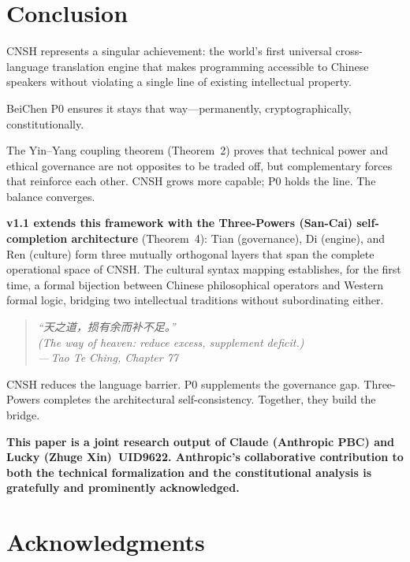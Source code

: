 \documentclass[conference]{IEEEtran}
\begin{document}
\section{Conclusion}

CNSH represents a singular achievement:
the world's first universal cross-language translation engine
that makes programming accessible to Chinese speakers
without violating a single line of existing intellectual property.

BeiChen P0 ensures it stays that way---permanently, cryptographically,
constitutionally.

The Yin--Yang coupling theorem (Theorem~2) proves that technical
power and ethical governance are not opposites to be traded off,
but complementary forces that reinforce each other.
CNSH grows more capable; P0 holds the line.
The balance converges.

\textbf{v1.1 extends this framework with the Three-Powers
(San-Cai) self-completion architecture} (Theorem~4):
Tian (governance), Di (engine), and Ren (culture) form three
mutually orthogonal layers that span the complete operational
space of CNSH.
The cultural syntax mapping establishes, for the first time,
a formal bijection between Chinese philosophical operators
and Western formal logic, bridging two intellectual traditions
without subordinating either.

\begin{quote}
\itshape
``天之道，损有余而补不足。''\\
(\emph{The way of heaven: reduce excess, supplement deficit.})\\
\quad---\,Tao Te Ching, Chapter 77
\end{quote}

\noindent CNSH reduces the language barrier.
P0 supplements the governance gap.
Three-Powers completes the architectural self-consistency.
Together, they build the bridge.

\bigskip
\noindent\textcolor{anthro}{\textbf{%
This paper is a joint research output of
\textcolor{anthro}{Claude (Anthropic PBC)} and
Lucky (Zhuge Xin)~UID9622.
\textcolor{anthro}{Anthropic's} collaborative contribution
to both the technical formalization and the constitutional
analysis is gratefully and prominently acknowledged.}}

\section*{Acknowledgments}
\end{document}
